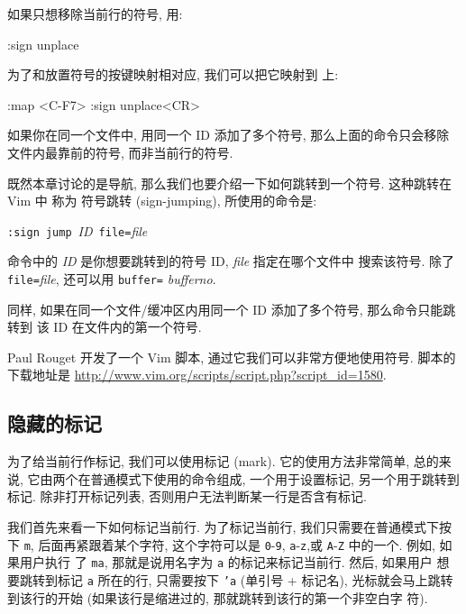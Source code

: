\begin{vimcode}
如果只想移除当前行的符号, 用:
\begin{vimcode}
:sign unplace
\end{vimcode}
为了和放置符号的按键映射相对应, 我们可以把它映射到  上:
\begin{vimcode}
:map <C-F7> :sign unplace<CR>
\end{vimcode}

\begin{warning}
    如果你在同一个文件中, 用同一个 ID 添加了多个符号, 那么上面的命令只会移除
    文件内最靠前的符号, 而非当前行的符号.
\end{warning}

既然本章讨论的是导航, 那么我们也要介绍一下如何跳转到一个符号. 这种跳转在 Vim 中
称为 符号跳转 (sign-jumping), 所使用的命令是:
\begin{vimcmdform}
\texttt{:sign jump}\ \textit{ID}\ \texttt{file=}\textit{file}
\end{vimcmdform}
命令中的 \textit{ID} 是你想要跳转到的符号 ID, \textit{file} 指定在哪个文件中
搜索该符号. 除了 \texttt{file=}\textit{file}, 还可以用 \texttt{buffer=}%
\textit{bufferno}.

同样, 如果在同一个文件/缓冲区内用同一个 ID 添加了多个符号, 那么命令只能跳转到
该 ID 在文件内的第一个符号.

\begin{warning}
    Paul Rouget 开发了一个 Vim 脚本, 通过它我们可以非常方便地使用符号. 脚本的
    下载地址是 \url{http://www.vim.org/scripts/script.php?script_id=1580}.
\end{warning}

\subsection{隐藏的标记}
\label{subsec:hidden_markers_using_marks}

为了给当前行作标记, 我们可以使用标记 (mark). 它的使用方法非常简单, 总的来说,
它由两个在普通模式下使用的命令组成, 一个用于设置标记, 另一个用于跳转到标记.
除非打开标记列表, 否则用户无法判断某一行是否含有标记.

我们首先来看一下如何标记当前行. 为了标记当前行, 我们只需要在普通模式下按下
\texttt{m}, 后面再紧跟着某个字符, 这个字符可以是 \texttt{0}-\texttt{9},
\texttt{a}-\texttt{z},或 \texttt{A}-\texttt{Z} 中的一个. 例如, 如果用户执行
了 \texttt{ma}, 那就是说用名字为 \texttt{a} 的标记来标记当前行. 然后, 如果用户
想要跳转到标记 \texttt{a} 所在的行, 只需要按下 \texttt{'a} (单引号 + 标记名),
光标就会马上跳转到该行的开始 (如果该行是缩进过的, 那就跳转到该行的第一个非空白字
符).


\end{vimcode}
